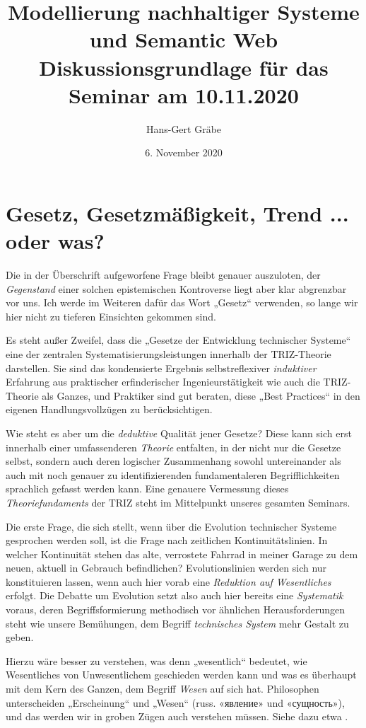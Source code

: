 \documentclass[11pt,a4paper]{article}
\title{Modellierung nachhaltiger Systeme und Semantic Web\\
  Diskussionsgrundlage für das Seminar am 10.11.2020}
\author{Hans-Gert Gr\"abe}
\date{6. November 2020}
\begin{document}
\maketitle

\section{Gesetz, Gesetzmäßigkeit, Trend ... oder was?}

Die in der Überschrift aufgeworfene Frage bleibt genauer auszuloten, der
\emph{Gegenstand} einer solchen epistemischen Kontroverse liegt aber klar
abgrenzbar vor uns. Ich werde im Weiteren dafür das Wort „Gesetz“ verwenden,
so lange wir hier nicht zu tieferen Einsichten gekommen sind.

Es steht außer Zweifel, dass die „Gesetze der Entwicklung technischer Systeme“
eine der zentralen Systematisierungsleistungen innerhalb der TRIZ-Theorie
darstellen. Sie sind das kondensierte Ergebnis selbstreflexiver
\emph{induktiver} Erfahrung aus praktischer erfinderischer Ingenieurstätigkeit
wie auch die TRIZ-Theorie als Ganzes, und Praktiker sind gut beraten, diese
„Best Practices“ in den eigenen Handlungsvollzügen zu berücksichtigen.

Wie steht es aber um die \emph{deduktive} Qualität jener Gesetze?  Diese kann
sich erst innerhalb einer umfassenderen \emph{Theorie} entfalten, in der nicht
nur die Gesetze selbst, sondern auch deren logischer Zusammenhang sowohl
untereinander als auch mit noch genauer zu identifizierenden fundamentaleren
Begriff\-lichkeiten sprachlich gefasst werden kann. Eine genauere Vermessung
dieses \emph{Theoriefundaments} der TRIZ steht im Mittelpunkt unseres
gesamten Seminars.

Die erste Frage, die sich stellt, wenn über die Evolution technischer Systeme
gesprochen werden soll, ist die Frage nach zeitlichen Kontinuitätslinien.  In
welcher Kontinuität stehen das alte, verrostete Fahrrad in meiner Garage zu
dem neuen, aktuell in Gebrauch befindlichen? Evolutionslinien werden sich nur
konstituieren lassen, wenn auch hier vorab eine \emph{Reduktion auf
  Wesentliches} erfolgt. Die Debatte um Evolution setzt also auch hier bereits
eine \emph{Systematik} voraus, deren Begriffsformierung methodisch vor
ähnlichen Herausforderungen steht wie unsere Bemühungen, dem Begriff
\emph{technisches System} mehr Gestalt zu geben.

Hierzu wäre besser zu verstehen, was denn „wesentlich“ bedeutet, wie
Wesentliches von Unwesentlichem geschieden werden kann und was es überhaupt
mit dem Kern des Ganzen, dem Begriff \emph{Wesen} auf sich hat.  Philosophen
unterscheiden „Erscheinung“ und „Wesen“
(russ. \foreignlanguage{russian}{«явление»} und
\foreignlanguage{russian}{«сущность»}), und das werden wir in groben Zügen
auch verstehen müssen. Siehe dazu etwa \cite{Schlemm2004}.
\newpage
\end{document}
